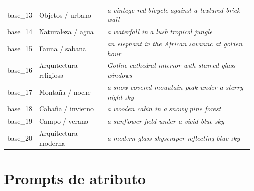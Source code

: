 \documentclass[12pt, a4paper, twoside]{book}
\begin{document}
\begin{longtable}{clp{9.5cm}}
base\_13 & Objetos / urbano & \textit{a vintage red bicycle against a textured brick wall} \\
base\_14 & Naturaleza / agua & \textit{a waterfall in a lush tropical jungle} \\
base\_15 & Fauna / sabana & \textit{an elephant in the African savanna at golden hour} \\
base\_16 & Arquitectura religiosa & \textit{Gothic cathedral interior with stained glass windows} \\
base\_17 & Montaña / noche & \textit{a snow-covered mountain peak under a starry night sky} \\
base\_18 & Cabaña / invierno & \textit{a wooden cabin in a snowy pine forest} \\
base\_19 & Campo / verano & \textit{a sunflower field under a vivid blue sky} \\
base\_20 & Arquitectura moderna & \textit{a modern glass skyscraper reflecting blue sky} \\
\end{longtable}

\section{Prompts de atributo}
\end{document}
